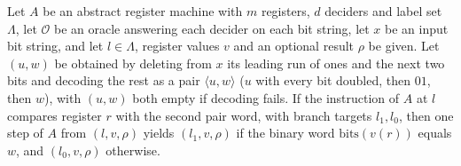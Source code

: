 \begin{lemma}
\label{Complexity.LogProg.astep_jeqSnd}
\leanok
{}
Let $A$ be an abstract register machine with $m$ registers, $d$ deciders and label set
$\Lambda$, let $\mathcal{O}$ be an oracle answering each decider on each bit string, let
$x$ be an input bit string, and let $l\in\Lambda$, register values $v$ and an optional
result $\rho$ be given. Let $(u,w)$ be obtained by deleting from $x$ its leading run of
ones and the next two bits and decoding the rest as a pair $\langle u,w\rangle$ ($u$ with
every bit doubled, then $01$, then $w$), with $(u,w)$ both empty if decoding fails. If
the instruction of $A$ at $l$ compares register $r$ with the second pair word, with
branch targets $l_1,l_0$, then one step of $A$ from $(l,v,\rho)$ yields $(l_1,v,\rho)$ if
the binary word $\mathrm{bits}(v(r))$ equals $w$, and $(l_0,v,\rho)$ otherwise.
\end{lemma}
